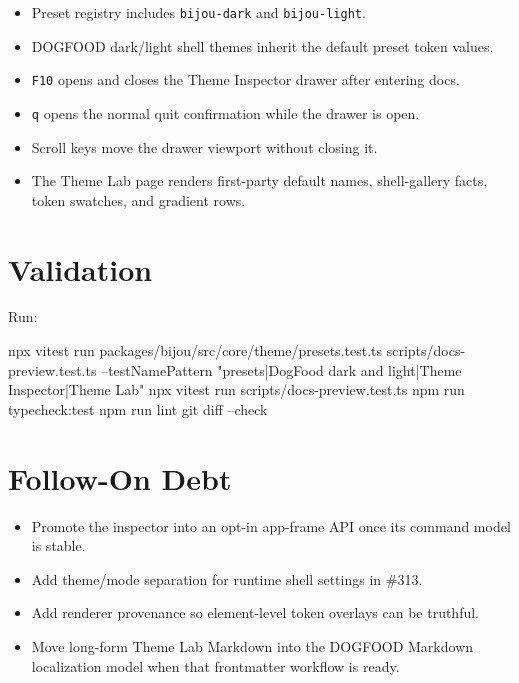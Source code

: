\begin{itemize}
\tightlist
\item
  Preset registry includes \texttt{b\allowbreak{}i\allowbreak{}j\allowbreak{}o\allowbreak{}u\allowbreak{}-\allowbreak{}d\allowbreak{}a\allowbreak{}r\allowbreak{}k} and \texttt{b\allowbreak{}i\allowbreak{}j\allowbreak{}o\allowbreak{}u\allowbreak{}-\allowbreak{}l\allowbreak{}i\allowbreak{}g\allowbreak{}h\allowbreak{}t}.
\item
  DOGFOOD dark/light shell themes inherit the default preset token values.
\item
  \texttt{F\allowbreak{}1\allowbreak{}0} opens and closes the Theme Inspector drawer after entering docs.
\item
  \texttt{q} opens the normal quit confirmation while the drawer is open.
\item
  Scroll keys move the drawer viewport without closing it.
\item
  The Theme Lab page renders first-party default names, shell-gallery facts, token swatches, and gradient rows.
\end{itemize}

\section{Validation}\label{record-179-validation}

Run:

\begin{CodeBlock}
npx vitest run packages/bijou/src/core/theme/presets.test.ts scripts/docs-preview.test.ts --testNamePattern "presets|DogFood dark and light|Theme Inspector|Theme Lab"
npx vitest run scripts/docs-preview.test.ts
npm run typecheck:test
npm run lint
git diff --check
\end{CodeBlock}

\section{Follow-On Debt}\label{record-179-follow-on-debt}

\begin{itemize}
\tightlist
\item
  Promote the inspector into an opt-in app-frame API once its command model is stable.
\item
  Add theme/mode separation for runtime shell settings in \#313.
\item
  Add renderer provenance so element-level token overlays can be truthful.
\item
  Move long-form Theme Lab Markdown into the DOGFOOD Markdown localization model when that frontmatter workflow is ready.
\end{itemize}

